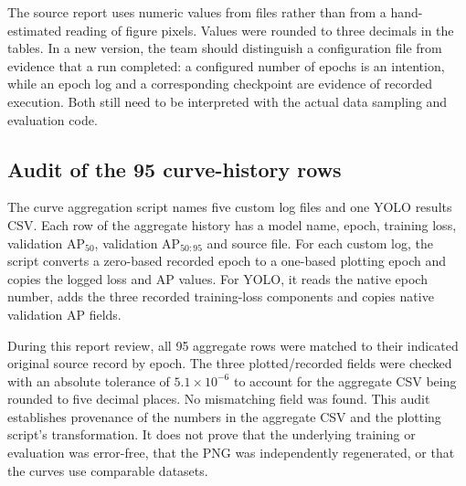 The source report uses numeric values from files rather than from a hand-estimated reading of figure pixels. Values were rounded to three decimals in the tables. In a new version, the team should distinguish a configuration file from evidence that a run completed: a configured number of epochs is an intention, while an epoch log and a corresponding checkpoint are evidence of recorded execution. Both still need to be interpreted with the actual data sampling and evaluation code.

\subsection{Audit of the 95 curve-history rows}
The curve aggregation script names five custom log files and one YOLO results CSV. Each row of the aggregate history has a model name, epoch, training loss, validation AP$_{50}$, validation AP$_{50:95}$ and source file. For each custom log, the script converts a zero-based recorded epoch to a one-based plotting epoch and copies the logged loss and AP values. For YOLO, it reads the native epoch number, adds the three recorded training-loss components and copies native validation AP fields.

During this report review, all 95 aggregate rows were matched to their indicated original source record by epoch. The three plotted/recorded fields were checked with an absolute tolerance of $5.1\times10^{-6}$ to account for the aggregate CSV being rounded to five decimal places. No mismatching field was found. This audit establishes provenance of the numbers in the aggregate CSV and the plotting script's transformation. It does not prove that the underlying training or evaluation was error-free, that the PNG was independently regenerated, or that the curves use comparable datasets.

